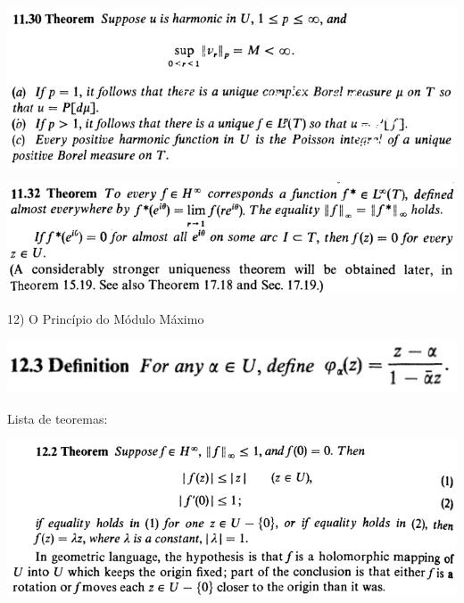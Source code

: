\documentclass[12pt]{article}
\begin{document}
		\begin{center}
		\includegraphics{11ponto30}
		\end{center}

		\begin{center}
		\includegraphics{11ponto32}
		\end{center}

\vspace{3mm}

12) O Princ\'ipio do M\'odulo M\'aximo

\vspace{3mm}

		\begin{center}
		\includegraphics{d12ponto3}
		\end{center}

Lista de teoremas:

		\begin{center}
		\includegraphics[scale=0.9]{12ponto2}
		\end{center}
\end{document}
